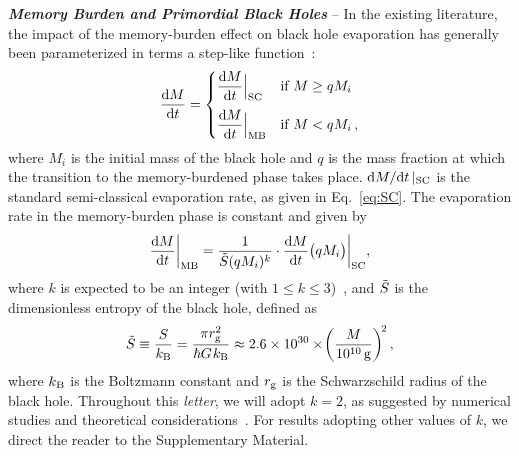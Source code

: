 \documentclass[aps, prl, reprint, preprintnumbers, showpacs, floatfix, nofootinbib, superscriptaddress, %
nofootinbib]{revtex4-1}
\begin{document}
\textit{\textbf{Memory Burden and Primordial Black Holes}} -- In the existing literature, the impact of the memory-burden effect on black hole evaporation has generally been parameterized in terms a step-like function~\cite{Dvali:2020wft, Alexandre:2024nuo, Dvali:2024hsb}:
%
\begin{align}
    &\qquad
        \frac{{\rm d}M}{{\rm d}t} =
        \begin{dcases}
            \frac{{\rm d} M}{{\rm d} t}\Big|_{\rm SC}
                & \text{if } M \geq q M_{i}\\[1mm]
            \frac{{\rm d} M}{{\rm d} t}\Big|_{\rm MB}
                & \text{if } M < q M_{i}\, ,
        \end{dcases} \quad & 
\label{eq:stepMB}
\end{align}
%
where $M_{i}$ is the initial mass of the black hole and $q$ is the mass fraction at which the transition to the memory-burdened phase takes place. ${\rm d}M/{\rm d}t\,|_{\rm SC}$ is the standard semi-classical evaporation rate, as given in Eq.~\eqref{eq:SC}. The evaporation rate in the memory-burden phase is constant and given by
%
\begin{align}
    \frac{{\rm d}M}{{\rm d}t}\bigg|_{\rm MB}
        =
            \frac{1}{\Tilde{S}(q M_{i})^k} \cdot 
            \frac{{\rm d}M}{{\rm d}t} \big(qM_{i}\big)\bigg|_{\rm SC},
\label{eq:MB}
\end{align}
%
where $k$ is expected to be an integer (with $1\leq k \leq 3$)~\cite{Dvali:2024hsb}, and $\Tilde{S}$ is the dimensionless entropy of the black hole, defined as~\cite{Bekenstein:1973ur}
%
\begin{equation}
    \Tilde{S}
        \equiv
            \frac{S}{k_{\rm B}}
        = 
            \frac{\pi r_{\rm g}^{2}}{\hbar G\mspace{1.5mu}k_{\rm B}}   
        \approx
            2.6\times 10^{30} \times \!\left(\frac{M}{10^{10}\,{\rm g}}\right)^{\!2}
            ,
\end{equation} 
%
where $k_{\rm B}$ is the Boltzmann constant and $r_{\rm g}$ is the Schwarzschild radius of the black hole. Throughout this \textit{letter}, we will adopt $k=2$, 
as suggested by numerical studies and theoretical considerations~\cite{Dvali:2020wft,Dvali:2024hsb,Dvali:2017nis}.
For results adopting other values of $k$, we direct the reader to the Supplementary Material.
\end{document}
